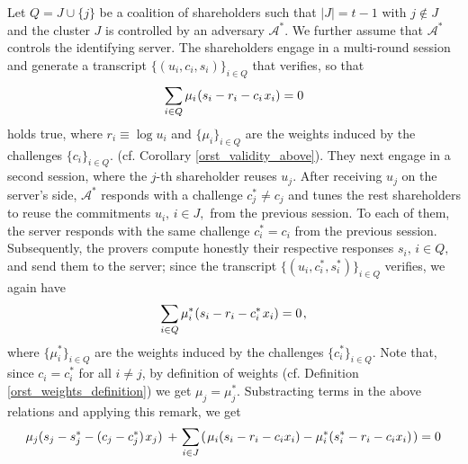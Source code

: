\documentclass{iacrtrans}
\begin{document}
Let $Q = J \cup \{j\}$ be a coalition of shareholders
such that $|J| = t-1$ with $j \not \in J$
and the cluster $J$ is controlled by an adversary $\mathcal{A}^*$.
We further assume that $\mathcal{A}^*$
controls the identifying server.
The shareholders engage in a multi-round
session and generate a transcript $\{(u_i, c_i, s_i)\}_{i \in Q}$
that verifies, so that
\vspace{5pt}
\begin{equation*}
\sum_{i \in Q}
\mu_i\hspace{0.5pt} (s_i - r_i - c_i\hspace{1pt}x_i)
=
0
\vspace{5pt}
\end{equation*}
holds true,
where $r_i \equiv \log u_i$
and $\{\mu_i\}_{i \in Q}$ are the weights
induced by the challenges $\{c_i\}_{i \in Q}$.
(cf. Corollary \ref{orst_validity_above}).
They next engage in a second session,
where the $j$-th shareholder reuses $u_j$.
After receiving $u_j$ on the server's side,
$\mathcal{A}^*$ responds with a challenge $c_j^* \neq c_j$
and tunes the rest shareholders to
reuse the commitments $u_i,\hspace{2pt} i \in J,$
from the previous session. To each of them,
the server responds with the same challenge
$c_i^* = c_i$
from the previous session.
Subsequently, the provers compute honestly their respective
responses $s_i,\hspace{2pt} i \in Q,$
and send them to the server;
since the transcript $\{(u_i, c_i^*, s_i^*)\}_{i \in Q}$
verifies, we again have
\vspace{5pt}
\begin{equation*}
\sum_{i \in Q}
\mu_i^*\hspace{0.5pt} (s_i - r_i - c_i^*\hspace{1pt}x_i)
=
0\hspace{1pt},
\vspace{5pt}
\end{equation*}
where $\{\mu_i^*\}_{i \in Q}$ are the weights induced
by the challenges $\{c_i^*\}_{i \in Q}$.
Note that,
since $c_i = c_i^*$ for all $i \neq j$,
by definition of weights
(cf. Definition \ref{orst_weights_definition})
we get $\mu_j = \mu_j^*$.
Substracting terms in the above relations and applying this remark,
we get
\vspace{5pt}
\begin{equation*}
\mu_j (s_j - s_j^* - (c_j - c_j^*)\hspace{1pt} x_j)
\hspace{2pt}
+
\hspace{1pt}
\sum_{i \in J}\hspace{1pt}
(
\hspace{1pt}
\mu_i (s_i - r_i - c_i x_i)
-
\mu_i^* (s_i^* - r_i - c_i x_i)
\hspace{1pt}
)
=
0\hspace{1pt}
\vspace{5pt}
\end{equation*}
\end{document}
